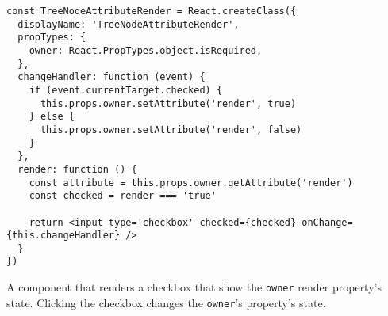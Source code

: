 \begin{listing}
  \begin{verbatim}
const TreeNodeAttributeRender = React.createClass({
  displayName: 'TreeNodeAttributeRender',
  propTypes: {
    owner: React.PropTypes.object.isRequired,
  },
  changeHandler: function (event) {
    if (event.currentTarget.checked) {
      this.props.owner.setAttribute('render', true)
    } else {
      this.props.owner.setAttribute('render', false)
    }
  },
  render: function () {
    const attribute = this.props.owner.getAttribute('render')
    const checked = render === 'true'

    return <input type='checkbox' checked={checked} onChange={this.changeHandler} />
  }
})
  \end{verbatim}
  \caption{A component that renders a checkbox that show the \texttt{owner} render property's state. Clicking the checkbox changes the \texttt{owner}'s property's state.}
  \label{list:checkbox}
\end{listing}
